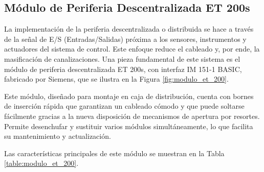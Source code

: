 \subsection{Módulo de Periferia Descentralizada ET 200s} \label{sec:moduloEt200}

La implementación de la periferia descentralizada o distribuida se hace a través de la señal de E/S (Entradas/Salidas) próxima a los sensores, instrumentos y actuadores del sistema de control. Este enfoque reduce el cableado y, por ende, la masificación de canalizaciones. Una pieza fundamental de este sistema es el módulo de periferia descentralizada ET 200s, con interfaz IM 151-1 BASIC, fabricado por Siemens, que se ilustra en la Figura \ref{fig:modulo_et_200}.


Este módulo, diseñado para montaje en caja de distribución, cuenta con bornes de inserción rápida que garantizan un cableado cómodo y que puede soltarse fácilmente gracias a la nueva disposición de mecanismos de apertura por resortes. Permite desenchufar y sustituir varios módulos simultáneamente, lo que facilita su mantenimiento y actualización.

Las características principales de este módulo se muestran en la Tabla \ref{table:modulo_et_200}.

